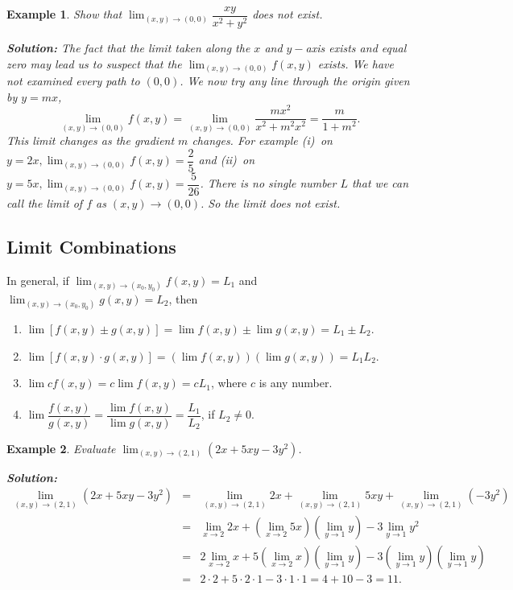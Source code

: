 \documentclass[titlepage,a4paper,12pt]{report}
\newtheorem{example}{Example}[section]
\begin{document}
 \begin{example}
 Show that $\displaystyle \lim _{(x,y)\rightarrow (0,0)}\dfrac{xy}{x^2+y^2}$ does not exist.
 
 \noindent \textbf{Solution:} The fact that the limit taken along the $x$ and $y-$axis exists and equal zero may lead us to suspect that the $\displaystyle \lim _{(x,y)\rightarrow (0,0)}f(x,y)$ exists. We have not examined every path to $(0,0)$. We now try any line through the origin given by $y=mx$, 
 \[\lim _{(x,y)\rightarrow (0,0)}f(x,y)=\lim _{(x,y)\rightarrow (0,0)}\dfrac{mx^2}{x^2+m^2x^2}=\dfrac{m}{1+m^2}.\]
 This limit changes as the gradient $m$ changes. For example (i)\, on $y=2x, \displaystyle \lim _{(x,y)\rightarrow (0,0)}f(x,y)=\dfrac{2}{5}$ and (ii)\, on $y=5x, \displaystyle \lim _{(x,y)\rightarrow (0,0)}f(x,y)=\dfrac{5}{26}$. There is no single number $L$ that we can call the limit of $f$ as $(x,y)\rightarrow (0,0)$. So the limit does not exist.
  \end{example}
 \subsection{Limit Combinations}
 In general, if $\displaystyle \lim _{(x,y)\rightarrow (x_0,y_0)}f(x,y)=L_1$ and $\displaystyle \lim _{(x,y)\rightarrow (x_0,y_0)}g(x,y)=L_2$, then 
 \begin{enumerate}
 \item $\displaystyle \lim [f(x,y)\pm g(x,y)]=\lim f(x,y)\pm\lim g(x,y)=L_1\pm L_2$.
 \item $\displaystyle \lim [f(x,y)\cdot g(x,y)]=(\lim f(x,y))(\lim g(x,y))=L_1L_2$.
 \item $\displaystyle \lim cf(x,y)=c\lim f(x,y)=cL_1$, where $c$ is any number.
 \item $\displaystyle \lim \dfrac{f(x,y)}{g(x,y)}=\dfrac{\lim f(x,y)}{\lim g(x,y)}=\dfrac{L_1}{L_2}$, if $L_2\neq 0$.
 \end{enumerate}
 \begin{example}
 Evaluate $\displaystyle \lim _{(x,y)\rightarrow (2,1)}(2x+5xy-3y^2)$.
 
 \noindent \textbf{Solution:} \begin{eqnarray*}
 \lim _{(x,y)\rightarrow (2,1)} (2x+5xy-3y^2) &=&  \lim _{(x,y)\rightarrow (2,1)} 2x + \lim _{(x,y)\rightarrow (2,1)} 5xy + \lim _{(x,y)\rightarrow (2,1)} (-3y^2)\\
 &=& \lim _{x\rightarrow 2} 2x + (\lim _{x\rightarrow 2} 5x)(\lim _{y\rightarrow 1}y)-3\lim _{y\rightarrow 1} y^2 \\
 &=& 2\lim _{x\rightarrow 2} x +5(\lim _{x\rightarrow 2}x)(\lim _{y\rightarrow 1}y)-3(\lim _{y\rightarrow 1}y)(\lim _{y\rightarrow 1}y)\\
 &=& 2 \cdot 2 +5\cdot 2 \cdot 1-3\cdot 1\cdot 1 =4+10-3=11.
 \end{eqnarray*}
 \end{example}
\end{document}
